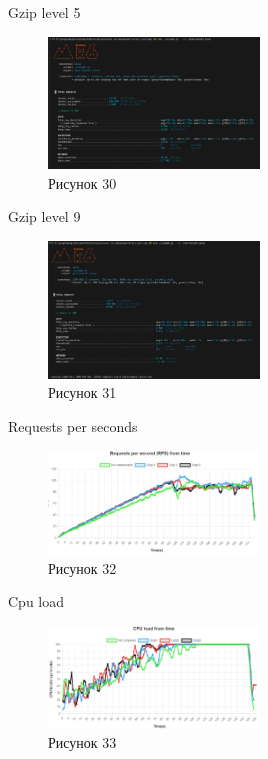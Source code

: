 \documentclass[12pt]{article}
\begin{document}
Gzip level 5
\begin{figure}[h!]
\centering
\includegraphics[width=0.5\textwidth]{../images/second_part/gzip5_screenshot.png}
\caption{Рисунок 30}
\end{figure}

Gzip level 9
\begin{figure}[h!]
\centering
\includegraphics[width=0.5\textwidth]{../images/second_part/gzip9_screenshot.png}
\caption{Рисунок 31}
\end{figure}

Requests per seconds
\begin{figure}[h!]
\centering
\includegraphics[width=0.5\textwidth]{../images/second_part/RPS.png}
\caption{Рисунок 32}
\end{figure}

Cpu load
\begin{figure}[h!]
\centering
\includegraphics[width=0.5\textwidth]{../images/second_part/CPU_load.png}
\caption{Рисунок 33}
\end{figure}
\end{document}
